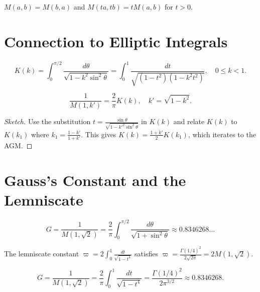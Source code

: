 \begin{theorem}
$M(a,b) = M(b,a)$ and $M(ta, tb) = t M(a,b)$ for $t > 0$.
\end{theorem}

\section{Connection to Elliptic Integrals}

\begin{definition}
\[
K(k) = \int_0^{\pi/2} \frac{d\theta}{\sqrt{1 - k^2 \sin^2\theta}} = \int_0^1 \frac{dt}{\sqrt{(1-t^2)(1-k^2 t^2)}}, \quad 0 \le k < 1.
\]
\end{definition}

\begin{theorem}
\[
\frac{1}{M(1, k')} = \frac{2}{\pi} K(k), \quad k' = \sqrt{1-k^2}.
\]
\end{theorem}

\begin{proof}[Sketch]
Use the substitution $t = \frac{\sin\theta}{\sqrt{1 - k'^2 \sin^2\theta}}$ in $K(k)$ and relate $K(k)$ to $K(k_1)$ where $k_1 = \frac{1-k'}{1+k'}$. This gives $K(k) = \frac{1+k'}{2} K(k_1)$, which iterates to the AGM.
\end{proof}

\section{Gauss's Constant and the Lemniscate}

\begin{definition}
\[
G = \frac{1}{M(1, \sqrt{2})} = \frac{2}{\pi} \int_0^{\pi/2} \frac{d\theta}{\sqrt{1+\sin^2\theta}} \approx 0.8346268...
\]
\end{definition}

\begin{theorem}
The lemniscate constant $\varpi = 2 \int_0^1 \frac{dt}{\sqrt{1-t^4}}$ satisfies $\varpi = \frac{\Gamma(1/4)^2}{2\sqrt{2\pi}} = 2M(1, \sqrt{2})$.
\end{theorem}

\begin{definition}
\[
G = \frac{1}{M(1, \sqrt{2})} = \frac{2}{\pi} \int_0^1 \frac{dt}{\sqrt{1-t^4}} = \frac{\Gamma(1/4)^2}{2\pi^{3/2}} \approx 0.8346268.
\]
\end{definition}

